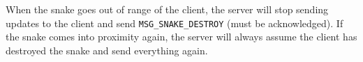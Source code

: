 When  the  snake goes out of range of the client, the server will stop  sending
updates to the client and send \verb$MSG_SNAKE_DESTROY$ (must be acknowledged).
If the snake comes  into  proximity  again,  the  server will always assume the
client has destroyed the snake and send everything again.

\begin{figure}[H]

\end{figure}

\vspace{1.5em}

\begin{figure}[H]

\end{figure}

\vspace{1.5em}

\begin{figure}[H]

\end{figure}

\vspace{1.5em}

\begin{figure}[H]

\end{figure}

\vspace{1.5em}

\begin{figure}[H]

\end{figure}

\vspace{1.5em}

\begin{figure}[H]

\end{figure}

